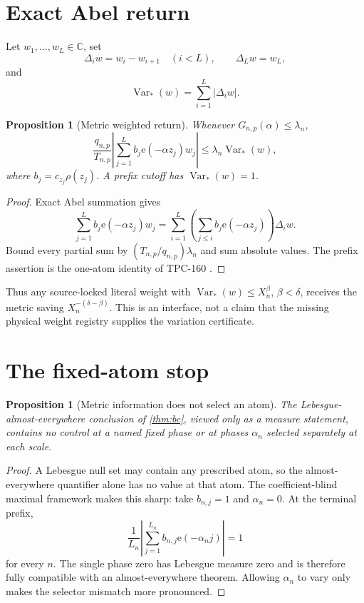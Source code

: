 \documentclass[11pt]{article}
\newtheorem{proposition}[theorem]{Proposition}
\theoremstyle{definition}
\newcommand{\e}{\mathrm e}
\begin{document}
\section{Exact Abel return}

Let \(w_1,\ldots,w_L\in\mathbb C\), set
\[
 \Delta_iw=w_i-w_{i+1}\quad(i<L),\qquad
 \Delta_Lw=w_L,
\]
and
\[
 \operatorname{Var}_*(w)=\sum_{i=1}^L|\Delta_iw|.
\]

\begin{proposition}[Metric weighted return]\label{prop:abel}
Whenever \(G_{n,p}(\alpha)\le\lambda_n\),
\begin{equation}
 \frac{q_{n,p}}{T_{n,p}}
 \left|\sum_{j=1}^{L}
 b_j\e(-\alpha z_j)w_j\right|
 \le\lambda_n\operatorname{Var}_*(w),
\label{eq:abel}
\end{equation}
where \(b_j=c_{z_j}\rho(z_j)\).  A prefix cutoff has
\(\operatorname{Var}_*(w)=1\).
\end{proposition}

\begin{proof}
Exact Abel summation gives
\[
 \sum_{j=1}^Lb_j\e(-\alpha z_j)w_j
 =
 \sum_{i=1}^L
 \left(\sum_{j\le i}b_j\e(-\alpha z_j)\right)\Delta_iw.
\]
Bound every partial sum by
\((T_{n,p}/q_{n,p})\lambda_n\) and sum absolute values.
The prefix assertion is the one-atom identity of TPC-160
\citep{WangTPC160}.
\end{proof}

Thus any source-locked literal weight with
\(\operatorname{Var}_*(w)\le X_n^\beta\), \(\beta<\delta\), receives
the metric saving \(X_n^{-(\delta-\beta)}\).  This is an interface,
not a claim that the missing physical weight registry supplies the
variation certificate.

\section{The fixed-atom stop}

\begin{proposition}[Metric information does not select an atom]
\label{prop:atom}
The Lebesgue-almost-everywhere conclusion of \cref{thm:bc}, viewed
only as a measure statement, contains no control at a named fixed
phase or at phases \(\alpha_n\) selected separately at each scale.
\end{proposition}

\begin{proof}
A Lebesgue null set may contain any prescribed atom, so the
almost-everywhere quantifier alone has no value at that atom.  The
coefficient-blind maximal framework makes this sharp: take
\(b_{n,j}=1\) and
\(\alpha_n=0\).  At the terminal prefix,
\[
 \frac1{L_n}\left|\sum_{j=1}^{L_n}b_{n,j}\e(-\alpha_nj)\right|=1
\]
for every \(n\).  The single phase zero has Lebesgue measure zero and
is therefore fully compatible with an almost-everywhere theorem.
Allowing \(\alpha_n\) to vary only makes the selector mismatch more
pronounced.
\end{proof}
\end{document}
